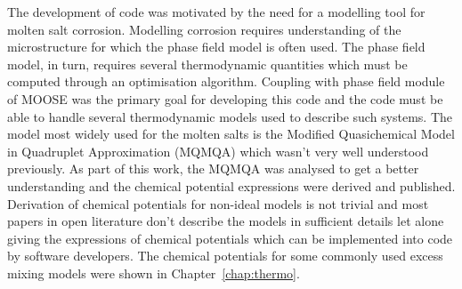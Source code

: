 	The development of code was motivated by the need for a modelling tool for molten salt corrosion. Modelling corrosion requires understanding of the microstructure for which the phase field model is often used. The phase field model, in turn, requires several thermodynamic quantities which must be computed through an optimisation algorithm. Coupling with phase field module of MOOSE was the primary goal for developing this code and the code must be able to handle several thermodynamic models used to describe such systems. The model most widely used for the molten salts is the Modified Quasichemical Model in Quadruplet Approximation (MQMQA) which wasn't very well understood previously. As part of this work, the MQMQA was analysed to get a better understanding and the chemical potential expressions were derived and published. Derivation of chemical potentials for non-ideal models is not trivial and most papers in open literature don't describe the models in sufficient details let alone giving the expressions of chemical potentials which can be implemented into code by software developers. The chemical potentials for some commonly used excess mixing models were shown in Chapter~\ref{chap:thermo}.
	

